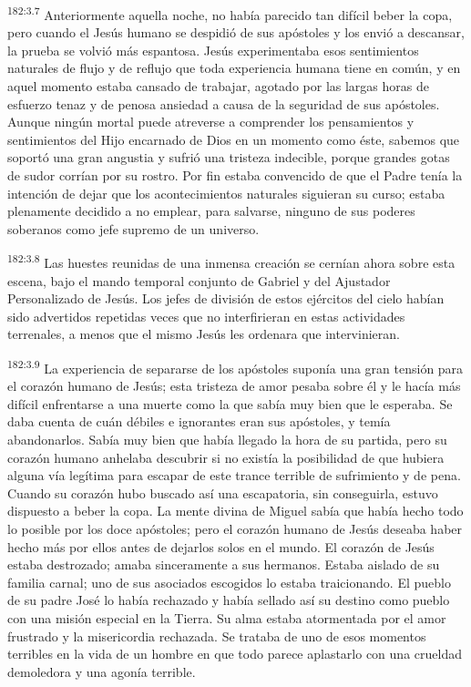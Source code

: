 \par 
\textsuperscript{182:3.7} Anteriormente aquella noche, no había parecido tan difícil beber la copa, pero cuando el Jesús humano se despidió de sus apóstoles y los envió a descansar, la prueba se volvió más espantosa. Jesús experimentaba esos sentimientos naturales de flujo y de reflujo que toda experiencia humana tiene en común, y en aquel momento estaba cansado de trabajar, agotado por las largas horas de esfuerzo tenaz y de penosa ansiedad a causa de la seguridad de sus apóstoles. Aunque ningún mortal puede atreverse a comprender los pensamientos y sentimientos del Hijo encarnado de Dios en un momento como éste, sabemos que soportó una gran angustia y sufrió una tristeza indecible, porque grandes gotas de sudor corrían por su rostro. Por fin estaba convencido de que el Padre tenía la intención de dejar que los acontecimientos naturales siguieran su curso; estaba plenamente decidido a no emplear, para salvarse, ninguno de sus poderes soberanos como jefe supremo de un universo.

\par 
\textsuperscript{182:3.8} Las huestes reunidas de una inmensa creación se cernían ahora sobre esta escena, bajo el mando temporal conjunto de Gabriel y del Ajustador Personalizado de Jesús. Los jefes de división de estos ejércitos del cielo habían sido advertidos repetidas veces que no interfirieran en estas actividades terrenales, a menos que el mismo Jesús les ordenara que intervinieran.

\par 
\textsuperscript{182:3.9} La experiencia de separarse de los apóstoles suponía una gran tensión para el corazón humano de Jesús; esta tristeza de amor pesaba sobre él y le hacía más difícil enfrentarse a una muerte como la que sabía muy bien que le esperaba. Se daba cuenta de cuán débiles e ignorantes eran sus apóstoles, y temía abandonarlos. Sabía muy bien que había llegado la hora de su partida, pero su corazón humano anhelaba descubrir si no existía la posibilidad de que hubiera alguna vía legítima para escapar de este trance terrible de sufrimiento y de pena. Cuando su corazón hubo buscado así una escapatoria, sin conseguirla, estuvo dispuesto a beber la copa. La mente divina de Miguel sabía que había hecho todo lo posible por los doce apóstoles; pero el corazón humano de Jesús deseaba haber hecho más por ellos antes de dejarlos solos en el mundo. El corazón de Jesús estaba destrozado; amaba sinceramente a sus hermanos. Estaba aislado de su familia carnal; uno de sus asociados escogidos lo estaba traicionando. El pueblo de su padre José lo había rechazado y había sellado así su destino como pueblo con una misión especial en la Tierra. Su alma estaba atormentada por el amor frustrado y la misericordia rechazada. Se trataba de uno de esos momentos terribles en la vida de un hombre en que todo parece aplastarlo con una crueldad demoledora y una agonía terrible.

